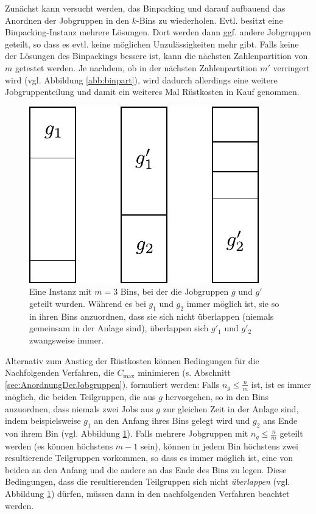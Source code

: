 \documentclass{scrreprt}
\begin{document}
Zunächst kann versucht werden, das Binpacking und darauf aufbauend das Anordnen der Jobgruppen in den $k$-Bins zu wiederholen.
Evtl. besitzt eine Binpacking-Instanz mehrere Lösungen.
Dort werden dann ggf. andere Jobgruppen geteilt, so dass es evtl. keine möglichen Unzulässigkeiten mehr gibt.
Falls keine der Lösungen des Binpackings bessere ist, kann die nächsten Zahlenpartition von $m$ getestet werden.
Je nachdem, ob in der nächsten Zahlenpartition $m'$ verringert wird (vgl. Abbildung \ref{abb:binpart}),
wird dadurch allerdings eine weitere Jobgruppenteilung und damit ein weiteres Mal Rüstkosten in Kauf genommen.

\begin{figure}
    \begin{center}
        \includegraphics[width=.4\textwidth]{graphics/ueberlappen.pdf}
    \end{center}
    \caption{
        \label{abb:ueberlappen}
        Eine Instanz mit $m=3$ Bins, bei der die Jobgruppen $g$ und $g'$ geteilt wurden.
        Während es bei $g_1$ und $g_2$ immer möglich ist, sie so in ihren Bins anzuordnen, dass sie sich nicht überlappen
        (niemals gemeinsam in der Anlage sind), überlappen sich $g'_1$ und $g'_2$ zwangsweise immer.
    }
\end{figure}
Alternativ zum Anstieg der Rüstkosten können Bedingungen für die Nachfolgenden Verfahren, die $C_{\max}$ minimieren (s. Abschnitt \ref{sec:AnordnungDerJobgruppen}), 
formuliert werden:
Falls $n_g \leq \frac{n}{m}$ ist, ist es immer möglich, die beiden Teilgruppen, die aus $g$ hervorgehen,
so in den Bins anzuordnen, dass niemals zwei Jobs aus $g$ zur gleichen Zeit in der Anlage sind, indem beispielsweise
$g_1$ an den Anfang ihres Bins gelegt wird und $g_2$ ans Ende von ihrem Bin (vgl. Abbildung \ref{abb:ueberlappen}).
Falls mehrere Jobgruppen mit $n_g \leq \frac{n}{m}$ geteilt werden (es können höchstens $m-1$ sein), können in jedem Bin höchstens zwei resultierende 
Teilgruppen vorkommen, so dass es immer möglich ist, eine von beiden an den Anfang und die andere an das Ende des Bins zu legen.
Diese Bedingungen, dass die resultierenden Teilgruppen sich nicht \textit{überlappen} (vgl. Abbildung \ref{abb:ueberlappen}) dürfen, 
müssen dann in den nachfolgenden Verfahren beachtet werden.
\end{document}

